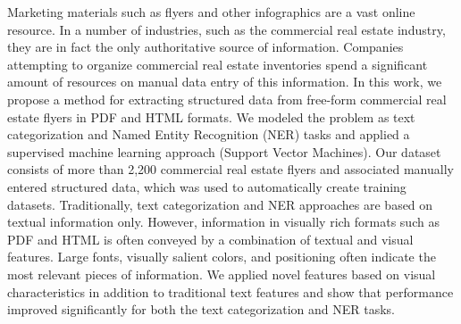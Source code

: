 Marketing materials such as flyers and other infographics are a vast online resource. In a number of industries, such as the commercial real estate industry, they are in fact the only authoritative source of information. Companies attempting to organize commercial real estate inventories spend a significant amount of resources on manual data entry of this information. In this work, we propose a method for extracting structured data from free-form commercial real estate flyers in PDF and HTML formats. We modeled the problem as text categorization and Named Entity Recognition (NER) tasks and applied a supervised machine learning approach (Support Vector Machines). Our dataset consists of more than 2,200 commercial real estate flyers and associated manually entered structured data, which was used to automatically create training datasets. Traditionally, text categorization and NER approaches are based on textual information only. However, information in visually rich formats such as PDF and HTML is often conveyed by a combination of textual and visual features. Large fonts, visually salient colors, and positioning often indicate the most relevant pieces of information. We applied novel features based on visual characteristics in addition to traditional text features and show that performance improved significantly for both the text categorization and NER tasks.
